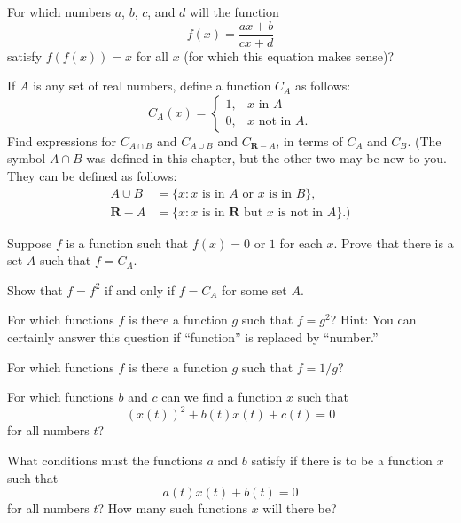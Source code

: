  For which numbers $a$, $b$, $c$, and $d$ will the function
\[
f(x) = \frac{ax+b}{cx+d}
\]
satisfy $f(f(x))=x$ for all $x$ (for which this equation makes sense)?

\begin{letters}
\item If $A$ is any set of real numbers, define a function $C_A$ as follows:
\[
C_A(x) =
\begin{cases}
1, & x\text{ in }A\\
0, & x\text{ not in }A.
\end{cases}
\]
Find expressions for $C_{A\cap B}$ and $C_{A\cup B}$ and $C_{\mathbf{R}-A}$,
in terms of $C_A$ and $C_B$. (The symbol $A \cap B$ was defined in this
chapter, but the other two may be new to you. They can be defined as follows:
\begin{align*}
A \cup B &= \{x : x\text{ is in }A\text{ or }x\text{ is in }B\},\\
\mathbf{R} - A &= \{x : x\text{ is in }\mathbf{R}\text{ but }x\text{ is not
in }A\}.)
\end{align*}
\item Suppose $f$ is a function such that $f(x)=0$ or $1$ for each $x$. Prove
that there is a set $A$ such that $f = C_A$.
\item Show that $f = f^2$ if and only if $f = C_A$ for some set $A$.
\end{letters}

\begin{letters}
\item For which functions $f$ is there a function $g$ such that $f = g^2$?
Hint: You can certainly answer this question if ``function'' is replaced by
``number.''
\item For which functions $f$ is there a function $g$ such that $f = 1/g$?
\item[*(c)] For which functions $b$ and $c$ can we find a function $x$ such
that
\[
(x(t))^2 + b(t)x(t) + c(t) = 0
\]
for all numbers $t$?
\item[*(d)] What conditions must the functions $a$ and $b$ satisfy if there
is to be a function $x$ such that
\[
a(t)x(t) + b(t) = 0
\]
for all numbers $t$? How many such functions $x$ will there be?
\end{letters}

